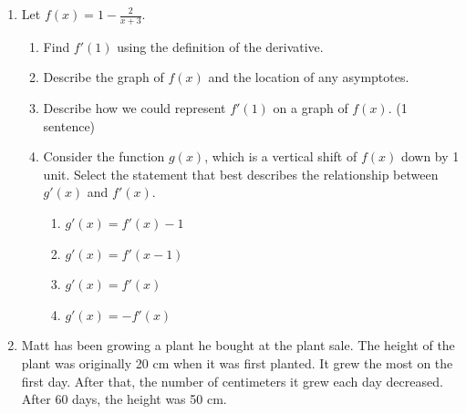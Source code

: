 \documentclass{article}
\begin{document}
\newpage

\begin{enumerate}

  \item Let $f(x)=1-\displaystyle\frac{2}{x+3}$. 
    \begin{enumerate}
        \item 
        \begin{problem}[\vfill]
        Find $f'(1)$ using the definition of the derivative. 
        \end{problem}
        
        \item 
        \begin{problem}[2.5in]
        Describe the graph of $f(x)$ and the location of any asymptotes.
        \end{problem}
        \item 
        \begin{problem}[1in]
        Describe how we could represent $f'(1)$ on a graph of $f(x)$. (1 sentence)
        \end{problem}

   \newpage
        \item 
        \begin{problem}[2cm] Consider the function $g(x)$, which is a vertical shift of $f(x)$ down by 1 unit. Select the statement that best describes the relationship between $g'(x)$ and $f'(x)$.
        
        \begin{enumerate}[label=\Alph*.]
            \item $g'(x)=f'(x)-1$
            \item $g'(x)= f'(x-1)$
            \item $g'(x) = f'(x)$
            \item $g'(x) = -f'(x)$
        \end{enumerate}
        \end{problem}
        
    \end{enumerate}

\item  Matt has been growing a plant he bought at the plant sale. The height of the plant was originally 20 cm when it was first planted. It grew the most on the first day. After that, the number of centimeters it grew each day decreased.  After 60 days, the height was 50 cm.


\end{enumerate}
\end{document}

